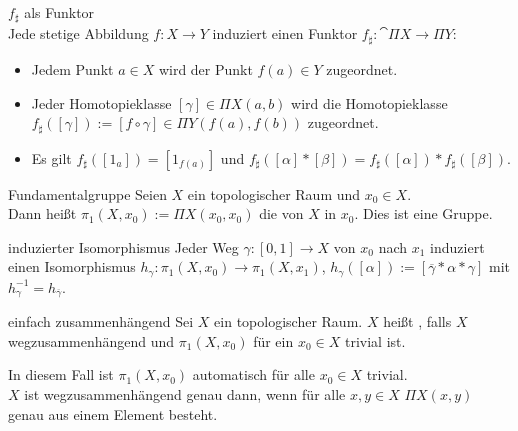 \begin{Satz}{$f_\sharp$ als Funktor}\\
    Jede stetige Abbildung $f\colon X \rightarrow Y$ induziert einen Funktor
    $f_\sharp\colon \cat{\Pi X} \rightarrow \Pi Y$:
    \begin{itemize}
        \item
        Jedem Punkt $a \in X$ wird der Punkt $f(a) \in Y$ zugeordnet.

        \item
        Jeder Homotopieklasse $[\gamma] \in \Pi X(a, b)$ wird die
        Homotopieklasse \\
        $f_\sharp([\gamma]) := [f \circ \gamma] \in \Pi Y(f(a), f(b))$
        zugeordnet.

        \item
        Es gilt $f_\sharp([1_a]) = [1_{f(a)}]$ und
        $f_\sharp([\alpha] \ast [\beta]) =
        f_\sharp([\alpha]) \ast f_\sharp([\beta])$.
    \end{itemize}
\end{Satz}

\linie

\begin{Def}{Fundamentalgruppe}
    Seien $X$ ein topologischer Raum und $x_0 \in X$. \\
    Dann heißt $\pi_1(X, x_0) := \Pi X(x_0, x_0)$
    die  von $X$ in $x_0$.
    Dies ist eine Gruppe.
\end{Def}

\begin{Satz}{induzierter Isomorphismus}
    Jeder Weg $\gamma\colon [0, 1] \rightarrow X$ von $x_0$ nach $x_1$
    induziert einen Isomorphismus
    $h_\gamma\colon \pi_1(X, x_0) \rightarrow \pi_1(X, x_1)$,
    $h_\gamma([\alpha]) := [\overline{\gamma} \ast \alpha \ast \gamma]$
    mit $h_\gamma^{-1} = h_{\overline{\gamma}}$.
\end{Satz}

\linie
\pagebreak

\begin{Def}{einfach zusammenhängend}
    Sei $X$ ein topologischer Raum.
    $X$ heißt , falls $X$ wegzusammenhängend
    und $\pi_1(X, x_0)$ für ein $x_0 \in X$ trivial ist.
\end{Def}

\begin{Bem}
    In diesem Fall ist $\pi_1(X, x_0)$ automatisch
    für alle $x_0 \in X$ trivial. \\
    $X$ ist wegzusammenhängend genau dann, wenn für alle $x, y \in X$
    $\Pi X(x, y)$ genau aus einem Element besteht.
\end{Bem}

